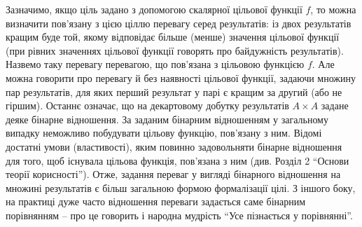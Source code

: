 \begin{enumerate}
	Зазначимо, якщо ціль задано з допомогою скалярної цільової функції $f$, то можна визначити пов'язану з цією ціллю перевагу серед результатів: із двох результатів кращим буде той, якому відповідає більше (менше) значення цільової функції (при рівних значеннях цільової функції говорять про байдужність результатів). Назвемо таку перевагу перевагою, що пов'язана з цільовою функцією $f$. Але можна говорити про перевагу й без наявності цільової функції, задаючи множину пар результатів, для яких перший результат у парі є кращим за другий (або не гіршим). Останнє означає, що на декартовому добутку результатів $A \times A$ задане деяке бінарне відношення. За заданим бінарним відношенням у загальному випадку неможливо побудувати цільову функцію, пов'язану з ним. Відомі достатні умови (властивості), яким повинно задовольняти бінарне відношення для того, щоб існувала цільова функція, пов'язана з ним (див. Розділ 2 ``Основи теорії корисності''). Отже, задання переваг у вигляді бінарного відношення на множині результатів є більш загальною формою формалізації цілі. З іншого боку, на практиці дуже часто відношення переваги задається саме бінарним порівнянням -- про це говорить і народна мудрість ``Усе пізнається у порівнянні''.
\end{enumerate}